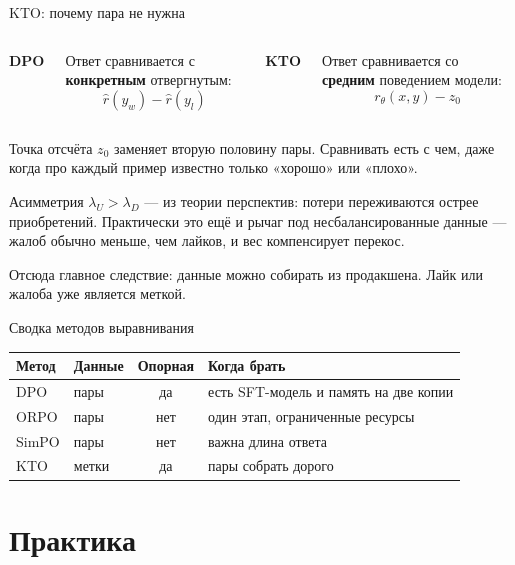 \documentclass[11pt,aspectratio=169]{beamer}
\newcommand{\key}[1]{%
  \begin{center}\colorbox{boxbg}{\parbox{0.92\textwidth}{\vspace{2pt}#1\vspace{2pt}}}\end{center}}
\newcommand{\aside}[1]{{\color{dim}\small #1}}
\begin{document}
\begin{frame}{KTO: почему пара не нужна}

\begin{columns}[t]
\textbf{\color{acc}DPO}

Ответ сравнивается с \textbf{конкретным} отвергнутым:
\[
\hat r(y_w) - \hat r(y_l)
\]

\textbf{\color{acc}KTO}

Ответ сравнивается со \textbf{средним} поведением модели:
\[
r_\theta(x,y) - z_0
\]
\end{columns}

\vspace{1em}
\key{Точка отсчёта $z_0$ заменяет вторую половину пары. Сравнивать есть
с чем, даже когда про каждый пример известно только «хорошо» или
«плохо».}

\vspace{0.8em}
Асимметрия $\lambda_U > \lambda_D$ — из теории перспектив: потери
переживаются острее приобретений. Практически это ещё и рычаг под
несбалансированные данные — жалоб обычно меньше, чем лайков, и вес
компенсирует перекос.

\vspace{0.5em}
\aside{Отсюда главное следствие: данные можно собирать из продакшена.
Лайк или жалоба уже является меткой.}

\end{frame}

\begin{frame}{Сводка методов выравнивания}

\begin{center}
\begin{tabular}{@{}llcp{4.6cm}@{}}
\toprule
\textbf{Метод} & \textbf{Данные} & \textbf{Опорная} & \textbf{Когда брать} \\
\midrule
DPO & пары & да & есть SFT-модель и память на две копии \\
ORPO & пары & нет & один этап, ограниченные ресурсы \\
SimPO & пары & нет & важна длина ответа \\
KTO & метки & да & пары собрать дорого \\
\bottomrule
\end{tabular}
\end{center}

\end{frame}

\section{Практика}
\end{document}
